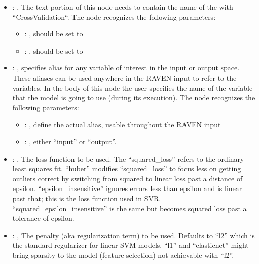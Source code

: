 \begin{itemize}
    \item {}: , 
      The text portion of this node needs to contain the name of the  with
               ``CrossValidation``.
      The  node recognizes the following parameters:
        \begin{itemize}
          \item {}: , 
            should be set to 
          \item {}: , 
            should be set to 
      \end{itemize}

    \item {}: , 
      specifies alias for         any variable of interest in the input or output space. These
      aliases can be used anywhere in the RAVEN input to         refer to the variables. In the body
      of this node the user specifies the name of the variable that the model is going to use
      (during its execution).
      The  node recognizes the following parameters:
        \begin{itemize}
          \item {}: , 
            define the actual alias, usable throughout the RAVEN input
          \item {}: , 
            either ``input'' or ``output''.
      \end{itemize}

    \item {}: , 
      The loss function to be used.                                                  The
      ``squared\_loss'' refers to the ordinary least squares fit. ``huber'' modifies
      ``squared\_loss'' to focus less on getting outliers correct by
      switching from squared to linear loss past a distance of epsilon. ``epsilon\_insensitive''
      ignores errors less than epsilon and is linear past
      that; this is the loss function used in SVR. ``squared\_epsilon\_insensitive'' is the same but
      becomes squared loss past a tolerance of epsilon.

    \item {}: \xmlDesc{[l2, l1, elasticnet]}, 
      The penalty (aka regularization term) to be used. Defaults to ``l2'' which is the standard
      regularizer for linear SVM models.                                                  ``l1'' and
      ``elasticnet'' might bring sparsity to the model (feature selection) not achievable with
      ``l2''.


\end{itemize}
